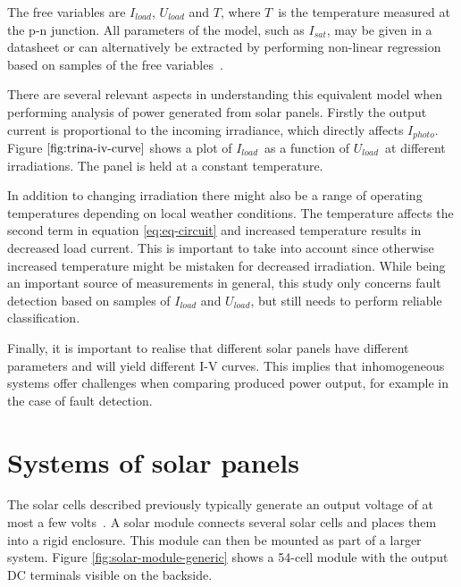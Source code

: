 The free variables are $I_{load}$, $U_{load}$ and $T$, where $T$ is the temperature measured at the p-n junction.
All parameters of the model, such as $I_{sat}$, may be given in a datasheet or can alternatively be extracted by performing non-linear regression based on samples of the free variables~\cite{Walker2001}.

There are several relevant aspects in understanding this equivalent model when performing analysis of power generated from solar panels.
Firstly the output current is proportional to the incoming irradiance, which directly affects $I_{photo}$.
Figure $\ref{fig:trina-iv-curve}$ shows a plot of $I_{load}$ as a function of $U_{load}$ at different irradiations.
The panel is held at a constant temperature.


In addition to changing irradiation there might also be a range of operating temperatures depending on local weather conditions.
The temperature affects the second term in equation \ref{eq:eq-circuit} and increased temperature results in decreased load current.
This is important to take into account since otherwise increased temperature might be mistaken for decreased irradiation.
While being an important source of measurements in general, this study only concerns fault detection based on samples of $I_{load}$ and $U_{load}$, but still needs to perform reliable classification.

Finally, it is important to realise that different solar panels have different parameters and will yield different I-V curves.
This implies that inhomogeneous systems offer challenges when comparing produced power output, for example in the case of fault detection.

\section{Systems of solar panels}
The solar cells described previously typically generate an output voltage of at most a few volts~\cite{Zhao2010thesis}.
A solar module connects several solar cells and places them into a rigid enclosure.
This module can then be mounted as part of a larger system.
Figure \ref{fig:solar-module-generic} shows a 54-cell module with the output DC terminals visible on the backside.

